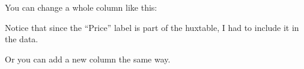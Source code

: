 \documentclass[
]{article}
\newenvironment{Shaded}{\begin{snugshade}}{\end{snugshade}}
\newcommand{\CommentTok}[1]{\textcolor[rgb]{0.56,0.35,0.01}{\textit{#1}}}
\newcommand{\FloatTok}[1]{\textcolor[rgb]{0.00,0.00,0.81}{#1}}
\newcommand{\FunctionTok}[1]{\textcolor[rgb]{0.00,0.00,0.00}{#1}}
\newcommand{\NormalTok}[1]{#1}
\newcommand{\OtherTok}[1]{\textcolor[rgb]{0.56,0.35,0.01}{#1}}
\newcommand{\SpecialCharTok}[1]{\textcolor[rgb]{0.00,0.00,0.00}{#1}}
\newcommand{\StringTok}[1]{\textcolor[rgb]{0.31,0.60,0.02}{#1}}
\begin{document}
\FloatBarrier

You can change a whole column like this:

\begin{Shaded}
\end{Shaded}

\FloatBarrier

Notice that since the ``Price'' label is part of the huxtable, I had to
include it in the data.

Or you can add a new column the same way.

\begin{Shaded}
\end{Shaded}

 
  \providecommand{\huxb}[2]{\arrayrulecolor[RGB]{#1}\global\arrayrulewidth=#2pt}
  \providecommand{\huxvb}[2]{\color[RGB]{#1}\vrule width #2pt}
  \providecommand{\huxtpad}[1]{\rule{0pt}{#1}}
  \providecommand{\huxbpad}[1]{\rule[-#1]{0pt}{#1}}
\end{document}
